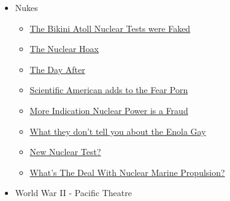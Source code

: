 \documentclass{article}
\newcommand{\insertmydocument}[2]{ %
  \item \href{http://www.mileswmathis.com/#2}{#1}
}
\begin{document}
\begin{itemize}
\begin{itemize}
    \item Nukes
    \begin{itemize}

      \insertmydocument{The Bikini Atoll Nuclear Tests were Faked}{bikini.pdf}
      \insertmydocument{The Nuclear Hoax}{trinity.pdf}
      \insertmydocument{The Day After}{dayafter.pdf}
      \insertmydocument{Scientific American adds to the Fear Porn}{sa2.pdf}
      \insertmydocument{More Indication Nuclear Power is a Fraud}{nuc3.pdf}
      \insertmydocument{What they don't tell you about the Enola Gay}{gay.pdf}
      \insertmydocument{New Nuclear Test?}{nucfake.pdf}
      \insertmydocument{What’s The Deal With Nuclear Marine Propulsion?}{navalreactor.pdf}
    \end{itemize}

    \item World War II - Pacific Theatre
    \begin{itemize}


\end{itemize}
\end{itemize}
\end{itemize}
\end{document}
